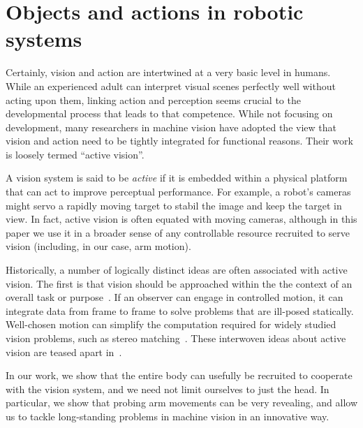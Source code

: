 \section{Objects and actions in robotic systems}

Certainly, vision and action are intertwined at a very basic level in
humans.  While an experienced adult can interpret visual scenes
perfectly well without acting upon them, linking action and perception
seems crucial to the developmental process that leads to that
competence.  While not focusing on development, many researchers in
machine vision have adopted the view that vision and action need to be
tightly integrated for functional reasons.  Their work is loosely
termed ``active vision''.

A vision system is said to be {\em active} if it is embedded within a
physical platform that can act to improve perceptual performance.  For
example, a robot's cameras might servo a rapidly moving target to
stabil\ize{} the image and keep the target in view.  In fact, active
vision is often equated with moving cameras, although in this paper we
use it in a broader sense of any controllable resource recruited to
serve vision (including, in our case, arm motion).

Historically, a number of logically distinct ideas are often
associated with active vision.  The first is that vision should be
approached within the the context of an overall task or
purpose~\cite{aloimonos87active}.  If an observer can engage in
controlled motion, it can integrate data from frame to frame to solve
problems that are ill-posed statically.  Well-chosen motion can
simplify the computation required for widely studied vision problems,
such as stereo matching~\cite{bajcsy88active,ballard91animate}.  These
interwoven ideas about active vision are teased apart
in~\cite{tarr94computational}.  

In our work, we show that the entire body can usefully be recruited to
cooperate with the vision system, and we need not limit ourselves to
just the head.  In particular, we show that probing arm movements
can be very revealing, and allow us to tackle long-standing problems 
in machine vision in an innovative way.

